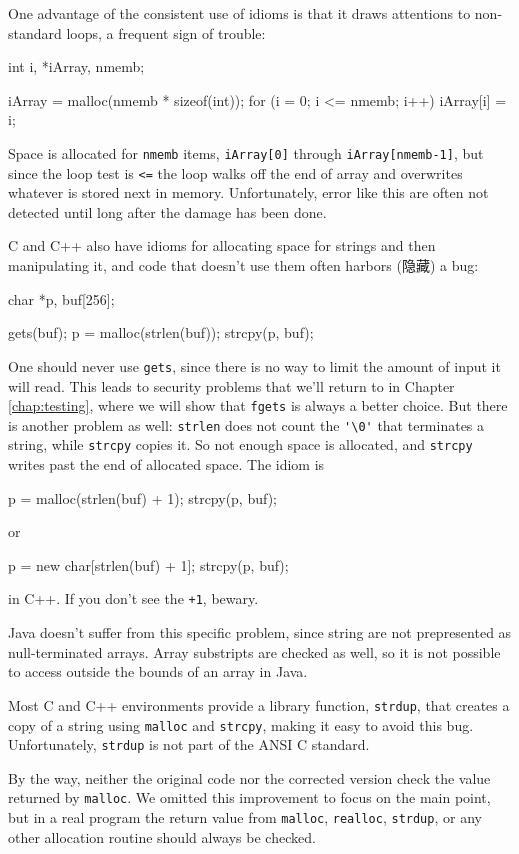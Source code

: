 One advantage of the consistent use of idioms is that it draws attentions
to non-standard loops, a frequent sign of trouble:
\begin{wellcode}
    int i, *iArray, nmemb;

    iArray = malloc(nmemb * sizeof(int));
    for (i = 0; i <= nmemb; i++)
        iArray[i] = i;
\end{wellcode}
Space is allocated for \verb'nmemb' items, \verb'iArray[0]' through
\verb'iArray[nmemb-1]', but since the loop test is \verb'<=' the loop walks
off the end of array and overwrites whatever is stored next in memory.
Unfortunately, error like this are often not detected until long after the
damage has been done.

C and C++ also have idioms for allocating space for strings and then
manipulating it, and code that doesn't use them often harbors (隐藏) a bug:
\begin{badcode}
    char *p, buf[256];

    gets(buf);
    p = malloc(strlen(buf));
    strcpy(p, buf);
\end{badcode}
One should never use \verb'gets', since there is no way to limit the amount
of input it will read. This leads to security problems that we'll return to
in Chapter \ref{chap:testing}, where we will show that \verb'fgets' is
always a better choice. But there is another problem as well:
\verb'strlen' does not count the \verb"'\0'" that terminates a string,
while \verb'strcpy' copies it. So not enough space is allocated, and
\verb'strcpy' writes past the end of allocated space. The idiom is 
\begin{wellcode}
    p = malloc(strlen(buf) + 1);
    strcpy(p, buf);
\end{wellcode}
or 
\begin{wellcode}
    p = new char[strlen(buf) + 1];
    strcpy(p, buf);
\end{wellcode}
in C++. If you don't see the \verb'+1', bewary.

Java doesn't suffer from this specific problem, since string are not
prepresented as null-terminated arrays. Array substripts are checked as
well, so it is not possible to access outside the bounds of an array in Java.

Most C and C++ environments provide a library function, \verb'strdup', that
creates a copy of a string using \verb'malloc' and \verb'strcpy', making it
easy to avoid this bug. Unfortunately, \verb'strdup' is not part of the
ANSI C standard.

By the way, neither the original code nor the corrected version check the
value returned by \verb'malloc'. We omitted this improvement to focus on
the main point, but in a real program the return value from \verb'malloc',
\verb'realloc', \verb'strdup', or any other allocation routine should
always be checked.

